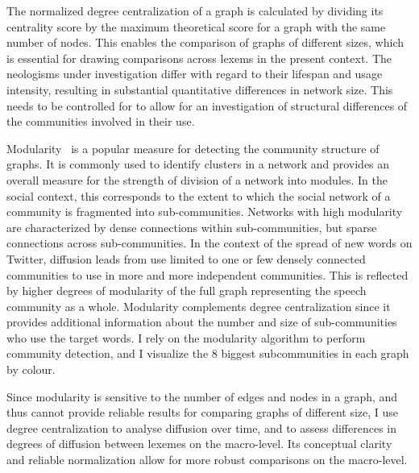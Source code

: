 \documentclass[
  a4paper,
  abstract=on,
  captions=tableabove
  ]{scrartcl}
\begin{document}
  The normalized degree centralization of a graph is calculated by dividing its centrality score by the maximum theoretical score for a graph with the same number of nodes. This enables the comparison of graphs of different sizes, which is essential for drawing comparisons across lexems in the present context. The neologisms under investigation differ with regard to their lifespan and usage intensity, resulting in substantial quantitative differences in network size. This needs to be controlled for to allow for an investigation of structural differences of the communities involved in their use.

  Modularity~\parencite{Blondel2008FastUnfolding} is a popular measure for detecting the community structure of graphs. It is commonly used to identify clusters in a network and provides an overall measure for the strength of division of a network into modules. In the social context, this corresponds to the extent to which the social network of a community is fragmented into sub-communities. Networks with high modularity are characterized by dense connections within sub-communities, but sparse connections across sub-communities. In the context of the spread of new words on Twitter, diffusion leads from use limited to one or few densely connected communities to use in more and more independent communities. This is reflected by higher degrees of modularity of the full graph representing the speech community as a whole. Modularity complements degree centralization since it provides additional information about the number and size of sub-communities who use the target words. I rely on the modularity algorithm to perform community detection, and I visualize the 8 biggest subcommunities in each graph by colour.

  Since modularity is sensitive to the number of edges and nodes in a graph, and thus cannot provide reliable results for comparing graphs of different size, I use degree centralization to analyse diffusion over time, and to assess differences in degrees of diffusion between lexemes on the macro-level. Its conceptual clarity and reliable normalization allow for more robust comparisons on the macro-level.
\end{document}
